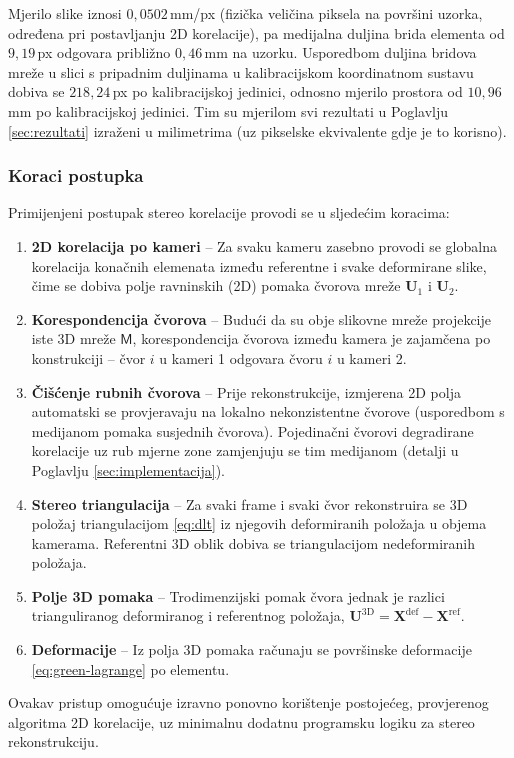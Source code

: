 Mjerilo slike iznosi $0{,}0502$\,mm/px (fizička veličina piksela na površini
uzorka, određena pri postavljanju 2D korelacije), pa medijalna duljina brida
elementa od $9{,}19$\,px odgovara približno $0{,}46$\,mm na uzorku. Usporedbom
duljina bridova mreže u slici s pripadnim duljinama u kalibracijskom koordinatnom
sustavu dobiva se $218{,}24$\,px po kalibracijskoj jedinici, odnosno mjerilo
prostora od $10{,}96$\,mm po kalibracijskoj jedinici. Tim su mjerilom svi
rezultati u Poglavlju \ref{sec:rezultati} izraženi u milimetrima (uz pikselske
ekvivalente gdje je to korisno).

\subsubsection{Koraci postupka}

Primijenjeni postupak stereo korelacije provodi se u sljedećim koracima:
\begin{enumerate}
  \item \textbf{2D korelacija po kameri} -- Za svaku kameru zasebno provodi se globalna
  korelacija konačnih elemenata između referentne i svake deformirane slike, čime se
  dobiva polje ravninskih (2D) pomaka čvorova mreže $\mathbf{U}_1$ i $\mathbf{U}_2$.
  \item \textbf{Korespondencija čvorova} -- Budući da su obje slikovne mreže projekcije
  iste 3D mreže $\mathsf{M}$, korespondencija čvorova između kamera je zajamčena po
  konstrukciji -- čvor $i$ u kameri 1 odgovara čvoru $i$ u kameri 2.
  \item \textbf{Čišćenje rubnih čvorova} -- Prije rekonstrukcije, izmjerena 2D polja
  automatski se provjeravaju na lokalno nekonzistentne čvorove (usporedbom s
  medijanom pomaka susjednih čvorova). Pojedinačni čvorovi degradirane korelacije
  uz rub mjerne zone zamjenjuju se tim medijanom (detalji u Poglavlju
  \ref{sec:implementacija}).
  \item \textbf{Stereo triangulacija} -- Za svaki frame i svaki čvor rekonstruira se 3D
  položaj triangulacijom \eqref{eq:dlt} iz njegovih deformiranih položaja u objema
  kamerama. Referentni 3D oblik dobiva se triangulacijom nedeformiranih položaja.
  \item \textbf{Polje 3D pomaka} -- Trodimenzijski pomak čvora jednak je razlici
  trianguliranog deformiranog i referentnog položaja,
  $\mathbf{U}^{\text{3D}} = \mathbf{X}^{\text{def}} - \mathbf{X}^{\text{ref}}$.
  \item \textbf{Deformacije} -- Iz polja 3D pomaka računaju se površinske deformacije
  \eqref{eq:green-lagrange} po elementu.
\end{enumerate}

Ovakav pristup omogućuje
izravno ponovno korištenje postojećeg, provjerenog algoritma 2D korelacije, uz
minimalnu dodatnu programsku logiku za stereo rekonstrukciju.
